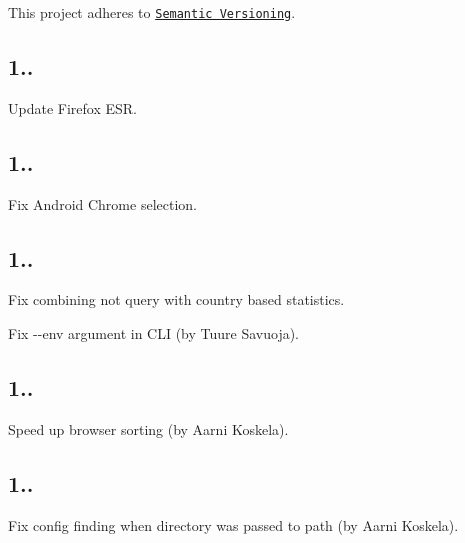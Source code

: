 This project adheres to \href{http://semver.org/}{\tt Semantic Versioning}.

\subsection*{1..}


\begin{DoxyItemize}
\item Update Firefox E\+SR.
\end{DoxyItemize}

\subsection*{1..}


\begin{DoxyItemize}
\item Fix Android Chrome selection.
\end{DoxyItemize}

\subsection*{1..}


\begin{DoxyItemize}
\item Fix combining {\ttfamily not} query with country based statistics.
\item Fix {\ttfamily -\/-\/env} argument in C\+LI (by Tuure Savuoja).
\end{DoxyItemize}

\subsection*{1..}


\begin{DoxyItemize}
\item Speed up browser sorting (by Aarni Koskela).
\end{DoxyItemize}

\subsection*{1..}


\begin{DoxyItemize}
\item Fix config finding when directory was passed to {\ttfamily path} (by Aarni Koskela).
\end{DoxyItemize}

